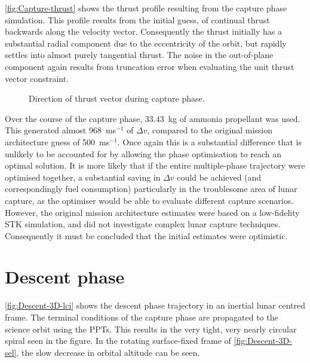 \autoref{fig:Capture-thrust} shows the thrust profile resulting from the capture phase simulation. This profile results from the initial guess, of continual thrust backwards along the velocity vector. Consequently the thrust initially has a substantial radial component due to the eccentricity of the orbit, but rapidly settles into almost purely tangential thrust. The noise in the out-of-plane component again results from truncation error when evaluating the unit thrust vector constraint.

\begin{figure}
\centering
\def\svgwidth{\figurewidth}

\caption{Direction of thrust vector during capture phase.} \label{fig:Capture-thrust}
\end{figure}

Over the course of the capture phase, 33.43~kg of ammonia propellant was used. This generated almost 968~ms$^{-1}$ of $\Delta v$, compared to the original mission architecture guess of 500~ms$^{-1}$. Once again this is a substantial difference that is unlikely to be accounted for by allowing the phase optimisation to reach an optimal solution. It is more likely that if the entire multiple-phase trajectory were optimised together, a substantial saving in $\Delta v$ could be achieved (and correspondingly fuel consumption) particularly in the troublesome area of lunar capture, as the optimiser would be able to evaluate different capture scenarios. However, the original mission architecture estimates were based on a low-fidelity STK simulation, and did not investigate complex lunar capture techniques. Consequently it must be concluded that the initial estimates were optimistic.



\clearpage


\section{Descent phase} \label{sec:Descent}

\autoref{fig:Descent-3D-lci} shows the descent phase trajectory in an inertial lunar centred frame. The terminal conditions of the capture phase are propagated to the science orbit using the PPTs. This results in the very tight, very nearly circular spiral seen in the figure.
In the rotating surface-fixed frame of \autoref{fig:Descent-3D-sel}, the slow decrease in orbital altitude can be seen.

